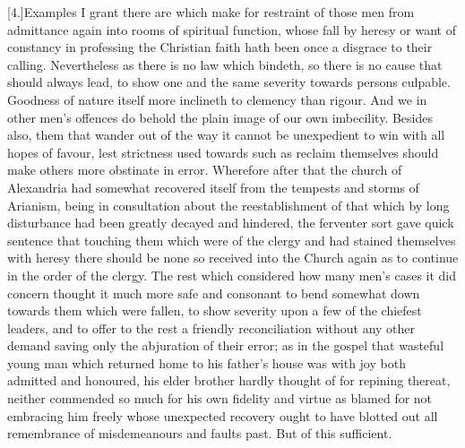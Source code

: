 [4.]Examples I grant there are which make for restraint of those men from admittance again into rooms of spiritual function, whose fall by heresy or want of constancy in professing the Christian faith hath been once a disgrace to their calling. Nevertheless as there is no law which bindeth, so there is no cause that should always lead, to show one and  the same severity towards persons culpable.
 Goodness of nature itself more inclineth to clemency than rigour. And we in other men’s offences do behold the plain image of our own imbecility. Besides also, them that wander out of the way it cannot be unexpedient to win with all hopes of favour, lest strictness used towards such as reclaim themselves should make others more obstinate in error. Wherefore after that the church of Alexandria had somewhat recovered itself from the tempests and storms of Arianism, being in consultation about the reestablishment of that which by long disturbance had been greatly decayed and hindered, the ferventer sort gave quick sentence that touching them which were of the clergy and had stained themselves with heresy there should be none so received into the Church again as to continue in the order of the clergy. The rest which considered how many men’s cases it did concern thought it much more safe and consonant to bend somewhat down towards them which were fallen, to show severity upon a few of the chiefest leaders, and to offer to the rest a friendly reconciliation without any other demand saving only the abjuration of their error; as in the gospel that wasteful  young man which returned home to his father’s house was with joy both admitted and honoured,
 his elder brother hardly thought of for repining thereat, neither commended so much for his own fidelity and virtue as blamed for not embracing him freely whose unexpected recovery ought to have blotted out all remembrance of misdemeanours and faults past. But of this sufficient.

